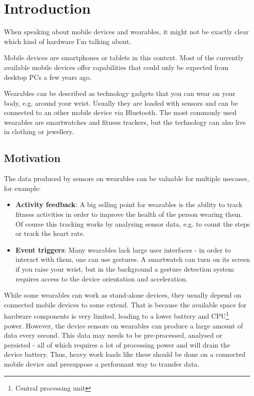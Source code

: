 \section{Introduction}
\label{sec:intro}

When speaking about mobile devices and wearables, it might not be exactly clear which kind of hardware I'm talking about.

Mobile devices are smartphones or tablets in this context. Most of the currently available mobile devices offer capabilities that could only be expected from desktop PCs a few years ago.

Wearables can be described as technology gadgets that you can wear on your body, e.g. around your wrist.
Usually they are loaded with sensors and can be connected to an other mobile device via Bluetooth.
The most commonly used wearables are smartwatches and fitness trackers, but the technology can also live in clothing or jewellery.


\subsection{Motivation}
The data produced by sensors on wearables can be valuable for multiple usecases, for example:
\begin{itemize}[noitemsep]
	\item \textbf{Activity feedback}:
	A big selling point for wearables is the ability to track fitness activities in order to improve the health of the person wearing them.
	Of course this tracking works by analysing sensor data, e.g. to count the steps or track the heart rate.
	\item \textbf{Event triggers}:
	Many wearables lack large user interfaces - in order to interact with them, one can use gestures.
	A smartwatch can turn on its screen if you raise your wrist, but in the background a gesture detection system requires access to the device orientation and acceleration.
\end{itemize}

While some wearables can work as stand-alone devices, they usually depend on connected mobile devices to some extend.
That is because the available space for hardware components is very limited, leading to a lower battery and CPU\footnote{Central processing unit} power.
However, the device sensors on wearables can produce a large amount of data every second.
This data may needs to be pre-processed, analysed or persisted - all of which requires a lot of processing power and will drain the device battery.
Thus, heavy work loads like these should be done on a connected mobile device and presuppose a performant way to transfer data.

